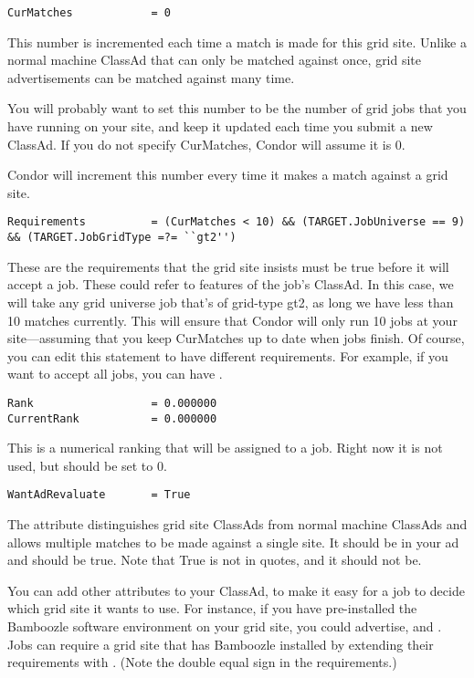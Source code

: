 \begin{verbatim}
CurMatches            = 0
\end{verbatim}

This number is incremented each time a match is made for this grid
site. Unlike a normal machine ClassAd that can only be matched against
once, grid site advertisements can be matched against many time. 

You will probably want to set this number to be the number of grid
jobs that you have running on your site, and keep it updated each time
you submit a new ClassAd. If you do not specify CurMatches, Condor
will assume it is 0.

Condor will increment this number every time it makes a match against
a grid site.

\footnotesize
\begin{verbatim}
Requirements          = (CurMatches < 10) && (TARGET.JobUniverse == 9) && (TARGET.JobGridType =?= ``gt2'')
\end{verbatim}
\normalsize

These are the requirements that the grid site insists must be true
before it will accept a job. These could refer to features of the
job's ClassAd. In this case, we will take any grid universe job that's
of grid-type gt2, as
long we have less than 10 matches currently. This will ensure that
Condor will only run 10 jobs at your site---assuming that you keep
CurMatches up to date when jobs finish. Of course, you can edit this
statement to have different requirements. For example, if you want to
accept all jobs, you can have .

\footnotesize
\begin{verbatim}
Rank                  = 0.000000
CurrentRank           = 0.000000
\end{verbatim}
\normalsize

This is a numerical ranking that will be assigned to a job. Right now
it is not used, but should be set to 0. 

\begin{verbatim}
WantAdRevaluate       = True
\end{verbatim}

The  attribute distinguishes grid site
ClassAds from normal machine ClassAds and allows multiple matches to
be made against a single site. It should be in your ad and should be
true. Note that True is not in quotes, and it should not be.

You can add other attributes to your ClassAd, to make it easy for a
job to decide which grid site it wants to use. For instance, if you
have pre-installed the Bamboozle software environment on your grid
site, you could advertise,  and
. Jobs can require a grid site that has
Bamboozle installed by extending their requirements with
. (Note the double equal sign in the
requirements.) 

